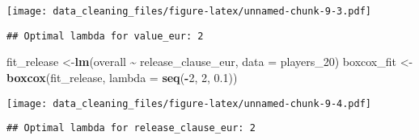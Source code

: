 \documentclass[
]{article}
\newenvironment{Shaded}{\begin{snugshade}}{\end{snugshade}}
\newcommand{\AttributeTok}[1]{\textcolor[rgb]{0.13,0.29,0.53}{#1}}
\newcommand{\DecValTok}[1]{\textcolor[rgb]{0.00,0.00,0.81}{#1}}
\newcommand{\FloatTok}[1]{\textcolor[rgb]{0.00,0.00,0.81}{#1}}
\newcommand{\FunctionTok}[1]{\textcolor[rgb]{0.13,0.29,0.53}{\textbf{#1}}}
\newcommand{\NormalTok}[1]{#1}
\newcommand{\OtherTok}[1]{\textcolor[rgb]{0.56,0.35,0.01}{#1}}
\newcommand{\SpecialCharTok}[1]{\textcolor[rgb]{0.81,0.36,0.00}{\textbf{#1}}}
\newcommand{\StringTok}[1]{\textcolor[rgb]{0.31,0.60,0.02}{#1}}
\begin{document}
\texttt{[image: data\_cleaning\_files/figure-latex/unnamed-chunk-9-3.pdf]}

\begin{Shaded}
\end{Shaded}

\begin{verbatim}
## Optimal lambda for value_eur: 2
\end{verbatim}

\begin{Shaded}
\begin{Highlighting}[]
\NormalTok{fit\_release }\OtherTok{\textless{}{-}}\FunctionTok{lm}\NormalTok{(overall }\SpecialCharTok{\textasciitilde{}}\NormalTok{ release\_clause\_eur, }\AttributeTok{data =}\NormalTok{ players\_20)}
\NormalTok{boxcox\_fit }\OtherTok{\textless{}{-}} \FunctionTok{boxcox}\NormalTok{(fit\_release, }\AttributeTok{lambda =} \FunctionTok{seq}\NormalTok{(}\SpecialCharTok{{-}}\DecValTok{2}\NormalTok{, }\DecValTok{2}\NormalTok{, }\FloatTok{0.1}\NormalTok{))}
\end{Highlighting}
\end{Shaded}

\texttt{[image: data\_cleaning\_files/figure-latex/unnamed-chunk-9-4.pdf]}

\begin{Shaded}
\end{Shaded}

\begin{verbatim}
## Optimal lambda for release_clause_eur: 2
\end{verbatim}
\end{document}
